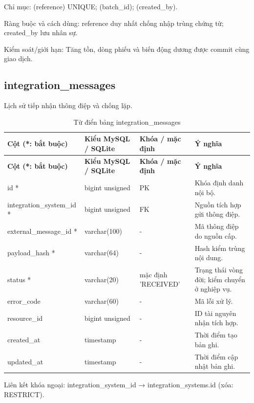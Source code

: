 Chỉ mục:\allowbreak{} (reference) UNIQUE; (batch\_\allowbreak{}id); (created\_\allowbreak{}by).\allowbreak{}

Ràng buộc và cách dùng:\allowbreak{} reference duy nhất chống nhập trùng chứng từ; created\_\allowbreak{}by lưu nhân sự.\allowbreak{}

Kiểm soát/\allowbreak{}giới hạn:\allowbreak{} Tăng tồn, dòng phiếu và biến động dương được commit cùng giao dịch.\allowbreak{}

\clearpage

\subsection{integration\_\allowbreak{}messages}
Lịch sử tiếp nhận thông điệp và chống lặp.\allowbreak{}


{\fontsize{10}{12}\selectfont\setlength{\tabcolsep}{3pt}\renewcommand{\arraystretch}{1.12}
\begin{longtable}{@{}L{\textwidth-4.86pt\relax} L{\textwidth-3.96pt\relax} L{\textwidth-2.88pt\relax} L{\textwidth-6.3pt\relax}@{}}
\caption{Từ điển bảng integration\_\allowbreak{}messages}\\
\toprule
\textbf{Cột (*:\allowbreak{} bắt buộc)} & \textbf{Kiểu My\allowbreak{}SQL /\allowbreak{} SQLite} & \textbf{Khóa /\allowbreak{} mặc định} & \textbf{Ý nghĩa}\\\midrule
\endfirsthead
\toprule
\textbf{Cột (*:\allowbreak{} bắt buộc)} & \textbf{Kiểu My\allowbreak{}SQL /\allowbreak{} SQLite} & \textbf{Khóa /\allowbreak{} mặc định} & \textbf{Ý nghĩa}\\\midrule
\endhead
\bottomrule\endlastfoot
id * & bigint unsigned & PK & Khóa định danh nội bộ.\allowbreak{}\\[1pt]
integration\_\allowbreak{}system\_\allowbreak{}id * & bigint unsigned & FK & Nguồn tích hợp gửi thông điệp.\allowbreak{}\\[1pt]
external\_\allowbreak{}message\_\allowbreak{}id * & varchar(100) & - & Mã thông điệp do nguồn cấp.\allowbreak{}\\[1pt]
payload\_\allowbreak{}hash * & varchar(64) & - & Hash kiểm trùng nội dung.\allowbreak{}\\[1pt]
status * & varchar(20) & mặc định 'RECEIVED' & Trạng thái vòng đời; kiểm chuyển ở nghiệp vụ.\allowbreak{}\\[1pt]
error\_\allowbreak{}code & varchar(60) & - & Mã lỗi xử lý.\allowbreak{}\\[1pt]
resource\_\allowbreak{}id & bigint unsigned & - & ID tài nguyên nhận tích hợp.\allowbreak{}\\[1pt]
created\_\allowbreak{}at & timestamp & - & Thời điểm tạo bản ghi.\allowbreak{}\\[1pt]
updated\_\allowbreak{}at & timestamp & - & Thời điểm cập nhật bản ghi.\allowbreak{}\\[1pt]
\end{longtable}}
Liên kết khóa ngoại:\allowbreak{} integration\_\allowbreak{}system\_\allowbreak{}id → integration\_\allowbreak{}systems.\allowbreak{}id (xóa:\allowbreak{} RESTRICT).\allowbreak{}

